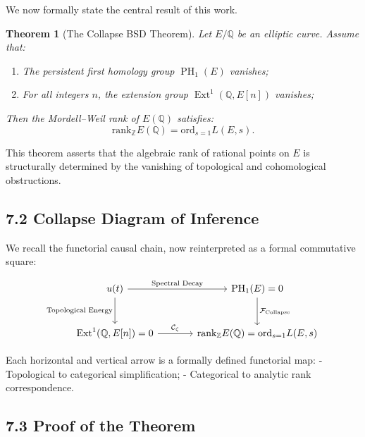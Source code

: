 \documentclass[11pt]{article}
\newtheorem{theorem}{Theorem}[section]
\DeclareMathOperator{\Ext}{Ext}
\DeclareMathOperator{\PH}{PH}
\newcommand{\QQ}{\mathbb{Q}}
\newcommand{\ZZ}{\mathbb{Z}}
\begin{document}
We now formally state the central result of this work.

\begin{theorem}[The Collapse BSD Theorem]
\label{thm:collapse-bsd}
Let $E/\QQ$ be an elliptic curve.  
Assume that:

\begin{enumerate}
  \item The persistent first homology group $\PH_1(E)$ vanishes;
  \item For all integers $n$, the extension group $\Ext^1(\QQ,E[n])$ vanishes;
\end{enumerate}

Then the Mordell–Weil rank of $E(\QQ)$ satisfies:
\[
\mathrm{rank}_{\ZZ} E(\QQ) = \mathrm{ord}_{s=1} L(E,s).
\]
\end{theorem}

This theorem asserts that the algebraic rank of rational points on $E$ is structurally determined by the vanishing of topological and cohomological obstructions.

\subsection{7.2 Collapse Diagram of Inference}

We recall the functorial causal chain, now reinterpreted as a formal commutative square:

\[
\begin{tikzcd}[row sep=large, column sep=large]
u(t) \arrow[r, "\text{Spectral Decay}"] \arrow[d, swap, "\text{Topological Energy}"]
& \PH_1(E) = 0 \arrow[d, "\mathcal{F}_{\mathrm{Collapse}}"] \\
\Ext^1(\QQ,E[n]) = 0 \arrow[r, "\mathcal{C}_{\zeta}"]
& \mathrm{rank}_{\ZZ} E(\QQ) = \mathrm{ord}_{s=1} L(E,s)
\end{tikzcd}
\]

Each horizontal and vertical arrow is a formally defined functorial map:
- Topological to categorical simplification;
- Categorical to analytic rank correspondence.

\subsection{7.3 Proof of the Theorem}
\end{document}
